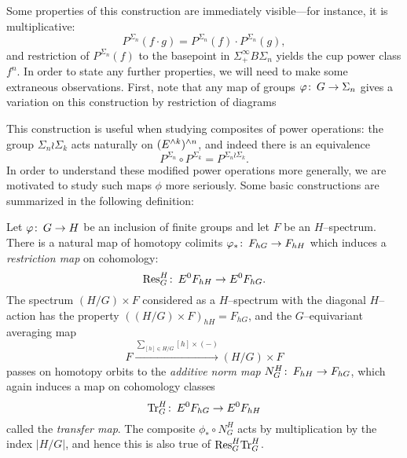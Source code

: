 Some properties of this construction are immediately visible---for instance, it is multiplicative: \[P^{\Sigma_n}(f \cdot g) = P^{\Sigma_n}(f) \cdot P^{\Sigma_n}(g),\] and restriction of \(P^{\Sigma_n}(f)\) to the basepoint in \(\Sigma^\infty_+ B\Sigma_n\) yields the cup power class \(f^n\).  In order to state any further properties, we will need to make some extraneous observations.  First, note that any map of groups \(\varphi\colon\thinspace G \to \Sigma_n\) gives a variation on this construction by restriction of diagrams
\begin{center}
\end{center}
This construction is useful when studying composites of power operations: the group \(\Sigma_n \wr \Sigma_k\) acts naturally on \((E^{\wedge k})^{\wedge n}\), and indeed there is an equivalence \[P^{\Sigma_n} \circ P^{\Sigma_k} = P^{\Sigma_n \wr \Sigma_k}.\]  In order to understand these modified power operations more generally, we are motivated to study such maps \(\phi\) more seriously.  Some basic constructions are summarized in the following definition:
\begin{definition}
Let \(\varphi\colon\thinspace G \to H\) be an inclusion of finite groups and let \(F\) be an \(H\)--spectrum.  There is a natural map of homotopy colimits \(\varphi_*\colon\thinspace F_{hG} \to F_{hH}\) which induces a \textit{restriction map} on cohomology: \[\mathrm{Res}_G^H\colon\thinspace E^0 F_{hH} \to E^0 F_{hG}.\]  The spectrum \((H/G) \times F\) considered as a \(H\)--spectrum with the diagonal \(H\)--action has the property \(((H/G) \times F)_{hH} = F_{hG}\), and the \(G\)--equivariant averaging map \[F \xrightarrow{\displaystyle \sum_{[h] \in H/G} [h] \times (-)} (H/G) \times F\] passes on homotopy orbits to the \textit{additive norm map} \(N_G^H\colon\thinspace F_{hH} \to F_{hG}\), which again induces a map on cohomology classes \[\mathrm{Tr}_G^H\colon\thinspace E^0 F_{hG} \to E^0 F_{hH}\] called the \textit{transfer map}.  The composite \(\phi_* \circ N_G^H\) acts by multiplication by the index \(|H/G|\), and hence this is also true of \(\mathrm{Res}^H_G \mathrm{Tr}^H_G\).
\end{definition}

